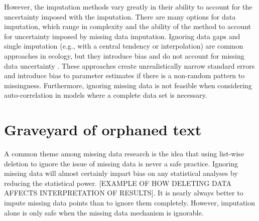 
 
 However, the imputation methods vary greatly in their ability to account for the uncertainty imposed with the imputation. There are many options for data imputation, which range in complexity and the ability of the method to account for uncertainty imposed by missing data imputation. Ignoring data gaps and single imputation (e.g., with a central tendency or interpolation) are common approaches in ecology, but they introduce bias and do not account for missing data uncertainty \citep{nakagawa_missing_2008, graham_missing_2009}. These approaches create unrealistically narrow standard errors \citep{nakagawa_missing_2015,mcknight_missing_2007} and introduce bias to parameter estimates if there is a non-random pattern to missingness. Furthermore, ignoring missing data is not feasible when considering auto-correlation in models where a complete data set is necessary. 


 \section*{Graveyard of orphaned text} %
A common theme among missing data research is the idea that using list-wise deletion to ignore the issue of missing data is never a safe practice. Ignoring missing data will almost certainly impart bias on any statistical analyses by reducing the statistical power. [EXAMPLE OF HOW DELETING DATA AFFECTS INTERPRETATION OF RESULTS]. It is nearly always better to impute missing data points than to ignore them completely. However, imputation alone is only safe when the missing data mechanism is ignorable.  



